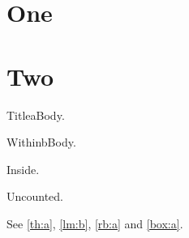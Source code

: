 \documentclass{article}
\begin{document}
\section{One}
\section{Two}
\begin{thm}{Title}{a}Body.\end{thm}
\begin{lem}{Within}{b}Body.\end{lem}
\begin{rawbox}[label=rb:a]Inside.\end{rawbox}
\begin{tcolorbox}[label=box:a]Uncounted.\end{tcolorbox}
See \ref{th:a}, \ref{lm:b}, \ref{rb:a} and \ref{box:a}.
\end{document}
